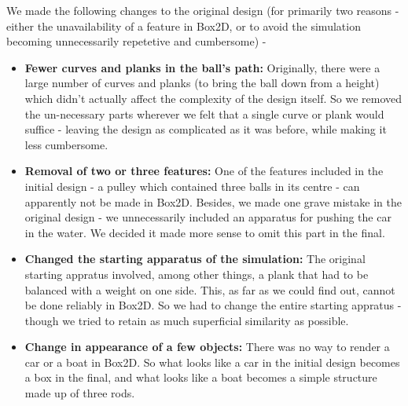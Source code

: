 \documentclass[a4paper,11pt]{article}
\begin{document}
		We made the following changes to the original design (for primarily two
		reasons - either the unavailability of a feature in Box2D, or to avoid
		the simulation becoming unnecessarily repetetive and cumbersome) -
		\begin{itemize}
			\item \textbf{Fewer curves and planks in the ball's path:} Originally,
			there were a large number of curves and planks (to bring the ball down
			from a height) which didn't actually affect the complexity of the
			design itself. So we removed the un-necessary parts wherever we felt
			that a single curve or plank would suffice - leaving the design as
			complicated as it was before, while making it less cumbersome.
			
			\item \textbf{Removal of two or three features:} One of the features
			included in the initial design - a pulley which contained three balls
			in its centre - can apparently not be made in Box2D. Besides, we
			made one grave mistake in the original design - we unnecessarily
			included an apparatus for pushing the car in the water. We decided it
			made more sense to omit this part in the final.
			
			\item \textbf{Changed the starting apparatus of the simulation:} The
			original starting appratus involved, among other things, a plank that
			had to be balanced with a weight on one side. This, as far as we could
			find out, cannot be done reliably in Box2D. So we had to change the
			entire starting appratus - though we tried to retain as much
			superficial similarity as possible.
			
			\item \textbf{Change in appearance of a few objects:} There was no way
			to render a car or a boat in Box2D. So what looks like a car in the
			initial design becomes a box in the final, and what looks like a boat
			becomes a simple structure made up of three rods.
		\end{itemize}
		
\end{document}
